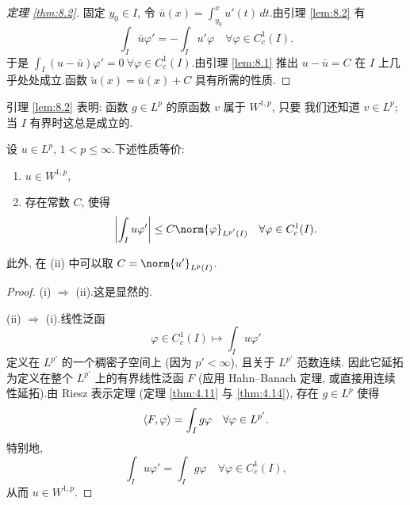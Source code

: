 \begin{proof}[定理 \ref{thm:8.2}]
固定 $y_0\in I$, 令 $\bar u(x)=\int_{y_0}^x u'(t)\,dt$.由引理  \ref{lem:8.2}
有
\begin{equation*}
\int_I\bar u\varphi'=-\int_I u'\varphi\quad\forall\varphi\in C_c^1(I).
\end{equation*}
于是 $\int_I(u-\bar u)\varphi'=0\ \forall\varphi\in C_c^1(I)$.由引理
 \ref{lem:8.1} 推出 $u-\bar u=C$ 在 $I$ 上几乎处处成立.函数
$\tilde u(x)=\bar u(x)+C$ 具有所需的性质.
\end{proof}

\begin{remark}
\label{rem:8.7}
引理  \ref{lem:8.2} 表明: 函数 $g\in L^p$ 的原函数 $v$ 属于 $W^{1,p}$, 只要
我们还知道 $v\in L^p$; 当 $I$ 有界时这总是成立的.
\end{remark}

\begin{proposition}
\label{prop:8.3}
设 $u\in L^p$, $1<p\le\infty$.下述性质等价:
\begin{enumerate}[label=(\roman*), leftmargin=2.6em, itemsep=0.2em]
	\item $u\in W^{1,p}$,
	\item 存在常数 $C$, 使得
	      \begin{equation*}
	      \abs{\int_I u\varphi'}\le C\norm{\varphi}_{L^{p'}(I)}
	      \quad\forall\varphi\in C_c^1(I).
	      \end{equation*}
\end{enumerate}
此外, 在 (ii) 中可以取 $C=\norm{u'}_{L^p(I)}$.
\end{proposition}

\begin{proof}
(i) $\Rightarrow$ (ii).这是显然的.

(ii) $\Rightarrow$ (i).线性泛函
\begin{equation*}
\varphi\in C_c^1(I)\mapsto\int_I u\varphi'
\end{equation*}
定义在 $L^{p'}$ 的一个稠密子空间上 (因为 $p'<\infty$), 且关于 $L^{p'}$ 范数连续.
因此它延拓为定义在整个 $L^{p'}$ 上的有界线性泛函 $F$ (应用 Hahn--Banach 定理,
或直接用连续性延拓).由 Riesz 表示定理 (定理  \ref{thm:4.11} 与
 \ref{thm:4.14}), 存在 $g\in L^p$ 使得
\begin{equation*}
\left\langle F,\varphi\right\rangle=\int_I g\varphi\quad\forall\varphi\in L^{p'}.
\end{equation*}
特别地,
\begin{equation*}
\int_I u\varphi'=\int_I g\varphi\quad\forall\varphi\in C_c^1(I),
\end{equation*}
从而 $u\in W^{1,p}$.
\end{proof}

